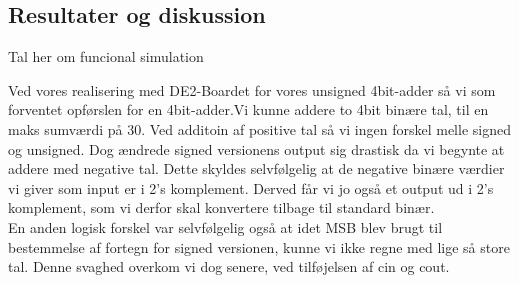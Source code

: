 \documentclass[../journal2.tex]{subfiles}
\begin{document}
\begin{table}[H]
    \centering
      \framebox{
        \rule{8pt}{0pt}
          
  }
  \caption{Kode for 4bit-adder med unsigned og signed architecture, c\textunderscore in}	
  \label{src:Tab4}
\end{table}


\subsection{Resultater og diskussion}

Tal her om funcional simulation


Ved vores realisering med DE2-Boardet for vores unsigned 4bit-adder så vi som forventet opførslen for en 4bit-adder.Vi kunne addere to 4bit binære tal, til en maks sumværdi på 30. Ved additoin af positive tal så vi ingen forskel melle signed og unsigned. Dog ændrede signed versionens output sig drastisk da vi begynte at addere med negative tal. Dette skyldes selvfølgelig at de negative binære værdier vi giver som input er i 2's komplement. Derved får vi jo også et output ud i 2's komplement, som vi derfor skal konvertere tilbage til standard binær.\\
En anden logisk forskel var selvfølgelig også at idet MSB blev brugt til bestemmelse af fortegn for signed versionen, kunne vi ikke regne med lige så store tal. Denne svaghed overkom vi dog senere, ved tilføjelsen af c\textunderscore in og c\textunderscore out.











\end{document}
